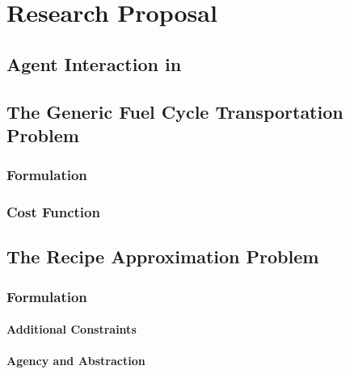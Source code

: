 \chapter{Research Proposal}\label{ch:research}



\section{Agent Interaction in \Cyclus}\label{sec:agent-interaction}


\section{The Generic Fuel Cycle Transportation Problem}\label{sec:gfctp}

\subsection{Formulation}



\subsection{Cost Function}\label{sec:cost-function}




\section{The Recipe Approximation Problem}\label{sec:rap}



\subsection{Formulation}



\subsubsection{Additional Constraints}



\subsubsection{Agency and Abstraction}



